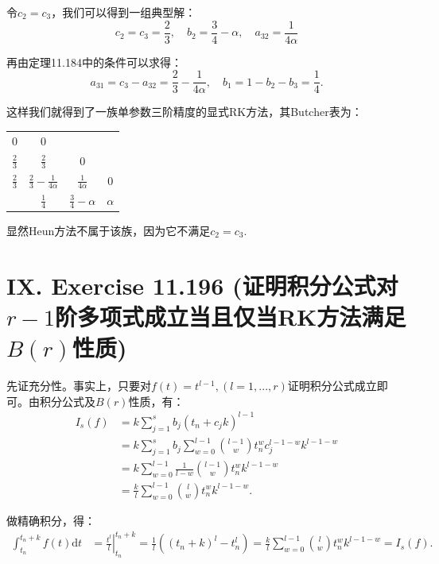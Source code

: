 \documentclass[twoside,a4paper]{article}
\begin{document}
令$c_2=c_3$，我们可以得到一组典型解：
\begin{equation*}
    c_2=c_3=\frac{2}{3},\quad b_2=\frac{3}{4}-\alpha,\quad a_{32}=\frac{1}{4\alpha}
\end{equation*}

再由定理11.184中的条件可以求得：
\begin{equation*}
    a_{31}=c_3-a_{32}=\frac{2}{3}-\frac{1}{4\alpha},\quad b_1=1-b_2-b_3=\frac{1}{4}.
\end{equation*}

这样我们就得到了一族单参数三阶精度的显式RK方法，其Butcher表为：

\begin{table}[H]
    \renewcommand\arraystretch{1.5}
    \centering
    \begin{tabular}{c|ccc}
        $0$           & $0$           &    &  \\
        $\frac{2}{3}$ & $\frac{2}{3}$ & $0$ & \\
        $\frac{2}{3}$ & $\frac{2}{3}-\frac{1}{4\alpha}$ & $\frac{1}{4\alpha}$ & $0$ \\ \hline
                    & $\frac{1}{4}$     & $\frac{3}{4}-\alpha$      & $\alpha$
    \end{tabular}
\end{table}

显然Heun方法不属于该族，因为它不满足$c_2=c_3$.

\section*{IX. Exercise 11.196 (证明积分公式对$r-1$阶多项式成立当且仅当RK方法满足$B(r)$性质)}

\;\;\;\;\;\;先证充分性。事实上，只要对$f(t)=t^{l-1},(l=1,...,r)$证明积分公式成立即可。由积分公式及$B(r)$性质，有：
\begin{align*}
    I_s(f) &= k\sum_{j=1}^s b_j (t_n+c_j k)^{l-1}\\
    &= k\sum_{j=1}^s b_j \sum_{w=0}^{l-1} \binom{l-1}{w}t_n^w c_j^{l-1-w}k^{l-1-w}\\
    &= k\sum_{w=0}^{l-1}\frac{1}{l-w}\binom{l-1}{w}t_n^wk^{l-1-w}\\
    &= \frac{k}{l}\sum_{w=0}^{l-1} \binom{l}{w}t_n^wk^{l-1-w}.
\end{align*}

做精确积分，得：
\begin{align*}
    \int_{t_n}^{t_n+k}f(t)\text{d}t&=\left.\frac{t^l}{l}\right|_{t_n}^{t_n+k}= \frac{1}{l}\left((t_n+k)^l-t_n^l\right)= \frac{k}{l}\sum_{w=0}^{l-1} \binom{l}{w}t_n^wk^{l-1-w}=I_s(f).
\end{align*}
\end{document}
